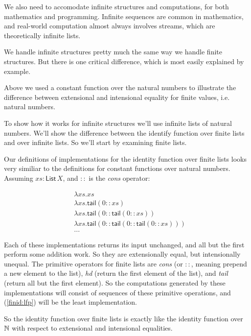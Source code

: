 \documentclass{article}
\begin{document}
We also need to accomodate infinite structures and computations, for
both mathematics and programming. Infinite sequences are common in
mathematics, and real-world computation almost always involves
streams, which are theoretically infinite lists.

We handle infinite structures pretty much the same way we handle
finite structures. But there is one critical difference, which is most
easily explained by example.

Above we used a constant function over the natural numbers to
illustrate the difference between extensional and intensional
equality for finite values, i.e. natural numbers.

To show how it works for infinite structures we'll use infinite lists
of natural numbers. We'll show the difference between the identify
function over finite lists and over infinite lists. So we'll start by
examining finite lists.

Our definitions of implementations for the identity function over
finite lists looks very similiar to the definitions for constant
functions over natural numbers. Assuming \(xs:\textsf{List}\,X\), and
\(::\) is the \textit{cons} operator:

\begin{align}
  & \lambda xs.xs \label{finid:lfp} \\
  & \lambda xs.\textsf{tail}(0::xs) \\
  & \lambda xs.\textsf{tail}(0::\textsf{tail}(0::xs) \label{finid:1}) \\
  & \lambda xs.\textsf{tail}(0::\textsf{tail}(0::\textsf{tail}(0::xs) \label{finid:2})) \\
  & ... \nonumber
\end{align}

Each of these implementations returns its input unchanged, and all but
the first perform some addition work. So they are extensionally equal,
but intensionally unequal. The primitive operators for finite lists
are \textit{cons} (or \(::\), meaning prepend a new element to the list),
\textit{hd} (return the first element of the list), and \textit{tail}
(return all but the first element). So the computations generated by
these implementations will consist of sequences of these primitive
operations, and (\ref{finid:lfp}) will be the least implementation.

So the identity function over finite lists is exactly like the
identity function over \(\mathbb{N}\) with respect to extensional and
intensional equalities.
\end{document}
